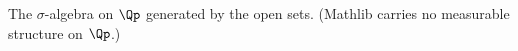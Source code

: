 The $\sigma$-algebra on $\Qp$ generated by the open sets. (Mathlib carries no measurable structure on $\Qp$.)
